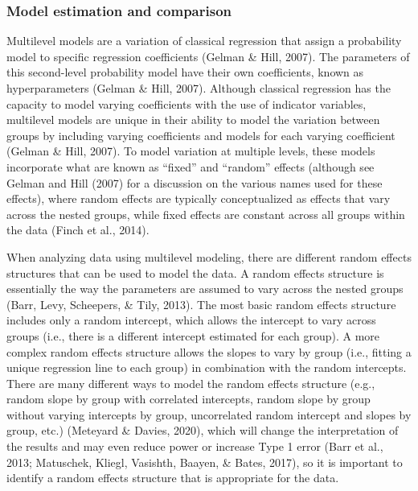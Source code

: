 \documentclass[
  english,
  man, noextraspace,floatsintext]{apa6}
\begin{document}
\hypertarget{model-estimation-and-comparison}{%
\subsubsection{Model estimation and comparison}\label{model-estimation-and-comparison}}

Multilevel models are a variation of classical regression that assign a probability model to specific regression coefficients (Gelman \& Hill, 2007). The parameters of this second-level probability model have their own coefficients, known as hyperparameters (Gelman \& Hill, 2007). Although classical regression has the capacity to model varying coefficients with the use of indicator variables, multilevel models are unique in their ability to model the variation between groups by including varying coefficients and models for each varying coefficient (Gelman \& Hill, 2007). To model variation at multiple levels, these models incorporate what are known as ``fixed'' and ``random'' effects (although see Gelman and Hill (2007) for a discussion on the various names used for these effects), where random effects are typically conceptualized as effects that vary across the nested groups, while fixed effects are constant across all groups within the data (Finch et al., 2014).

When analyzing data using multilevel modeling, there are different random effects structures that can be used to model the data. A random effects structure is essentially the way the parameters are assumed to vary across the nested groups (Barr, Levy, Scheepers, \& Tily, 2013). The most basic random effects structure includes only a random intercept, which allows the intercept to vary across groups (i.e., there is a different intercept estimated for each group). A more complex random effects structure allows the slopes to vary by group (i.e., fitting a unique regression line to each group) in combination with the random intercepts. There are many different ways to model the random effects structure (e.g., random slope by group with correlated intercepts, random slope by group without varying intercepts by group, uncorrelated random intercept and slopes by group, etc.) (Meteyard \& Davies, 2020), which will change the interpretation of the results and may even reduce power or increase Type 1 error (Barr et al., 2013; Matuschek, Kliegl, Vasishth, Baayen, \& Bates, 2017), so it is important to identify a random effects structure that is appropriate for the data.
\end{document}
